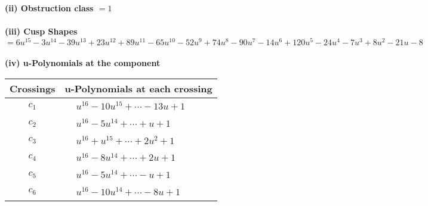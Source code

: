 \documentclass[1p]{elsarticle_modified}
\theoremstyle{definition}
\begin{document}
\flushleft \textbf{(ii) Obstruction class $= 1$}\\~\\
\flushleft \textbf{(iii) Cusp Shapes $= 6 u^{15}-3 u^{14}-39 u^{13}+23 u^{12}+89 u^{11}-65 u^{10}-52 u^9+74 u^8-90 u^7-14 u^6+120 u^5-24 u^4-7 u^3+8 u^2-21 u-8$}\\~\\
\newpage\renewcommand{\arraystretch}{1}
\flushleft \textbf{(iv) u-Polynomials at the component}\newline \\
\begin{tabular}{m{50pt}|m{274pt}}
Crossings & \hspace{64pt}u-Polynomials at each crossing \\
\hline $$\begin{aligned}c_{1}\end{aligned}$$&$\begin{aligned}
&u^{16}-10 u^{15}+\cdots-13 u+1
\end{aligned}$\\
\hline $$\begin{aligned}c_{2}\end{aligned}$$&$\begin{aligned}
&u^{16}-5 u^{14}+\cdots+u+1
\end{aligned}$\\
\hline $$\begin{aligned}c_{3}\end{aligned}$$&$\begin{aligned}
&u^{16}+u^{15}+\cdots+2 u^2+1
\end{aligned}$\\
\hline $$\begin{aligned}c_{4}\end{aligned}$$&$\begin{aligned}
&u^{16}-8 u^{14}+\cdots+2 u+1
\end{aligned}$\\
\hline $$\begin{aligned}c_{5}\end{aligned}$$&$\begin{aligned}
&u^{16}-5 u^{14}+\cdots- u+1
\end{aligned}$\\
\hline $$\begin{aligned}c_{6}\end{aligned}$$&$\begin{aligned}
&u^{16}-10 u^{14}+\cdots-8 u+1
\end{aligned}$\\

\end{tabular}
\end{document}
